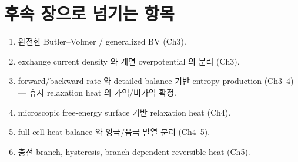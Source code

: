 \documentclass[11pt,a4paper]{article}
\begin{document}
\section{후속 장으로 넘기는 항목}\label{sec:ch2_transmit}
\begin{enumerate}[label=\arabic*),leftmargin=2.0em]
\item 완전한 Butler--Volmer / generalized BV (Ch3).
\item exchange current density 와 계면 overpotential 의 분리 (Ch3).
\item forward/backward rate 와 detailed balance 기반 entropy production (Ch3--4) — 휴지 relaxation heat 의
  가역/비가역 확정.
\item microscopic free-energy surface 기반 relaxation heat (Ch4).
\item full-cell heat balance 와 양극/음극 발열 분리 (Ch4--5).
\item 충전 branch, hysteresis, branch-dependent reversible heat (Ch5).
\end{enumerate}

\end{document}
